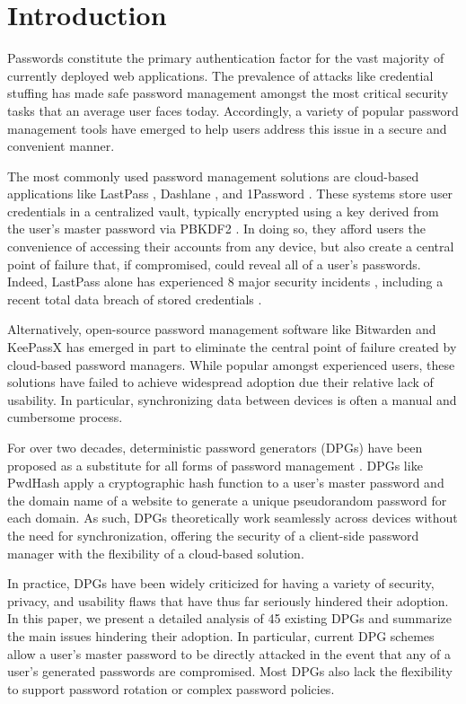 \section{Introduction}
Passwords constitute the primary authentication factor for the vast majority of currently deployed web applications. The prevalence of attacks like credential stuffing \cite{credential_stuffing} has made safe password management amongst the most critical security tasks that an average user faces today. Accordingly, a variety of popular password management tools have emerged to help users address this issue in a secure and convenient manner.

The most commonly used password management solutions are cloud-based applications like LastPass \cite{lastpass_arch}, Dashlane \cite{dashlane_arch}, and 1Password \cite{1password_arch}. These systems store user credentials in a centralized vault, typically encrypted using a key derived from the user's master password via PBKDF2 \cite{rfc2898}. In doing so, they afford users the convenience of accessing their accounts from any device, but also create a central point of failure that, if compromised, could reveal all of a user's passwords. Indeed, LastPass alone has experienced 8 major security incidents \cite{lastpass_security}, including a recent total data breach of stored credentials \cite{toubba_notice_2022}.

Alternatively, open-source password management software like Bitwarden \cite{bitwarden} and KeePassX \cite{keepassx} has emerged in part to eliminate the central point of failure created by cloud-based password managers. While popular amongst experienced users, these solutions have failed to achieve widespread adoption due their relative lack of usability. In particular, synchronizing data between devices is often a manual and cumbersome process.

\eject

For over two decades, deterministic password generators (DPGs) have been proposed as a substitute for all forms of password management \cite{karp2002site}. DPGs like PwdHash \cite{ross2005stronger} apply a cryptographic hash function to a user's master password and the domain name of a website to generate a unique pseudorandom password for each domain. As such, DPGs theoretically work seamlessly across devices without the need for synchronization, offering the security of a client-side password manager with the flexibility of a cloud-based solution. 

In practice, DPGs have been widely criticized for having a variety of security, privacy, and usability flaws \cite{noauthor_4_2016} that have thus far seriously hindered their adoption.
In this paper, we present a detailed analysis of 45 existing DPGs and summarize the main issues hindering their adoption.
In particular, current DPG schemes allow a user's master password to be directly attacked in the event that any of a user's generated passwords are compromised. Most DPGs also lack the flexibility to support password rotation or complex password policies.

